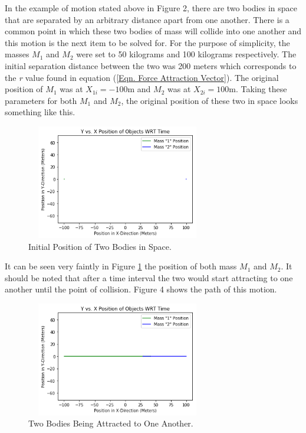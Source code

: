 \documentclass[twocolumn]{article}
\begin{document}
In the example of motion stated above in Figure 2, there are two bodies in space that are separated by an arbitrary distance apart from one another. There is a common point in which these two bodies of mass will collide into one another and this motion is the next item to be solved for. For the purpose of simplicity, the masses $M_1$ and $M_2$ were set to 50 kilograms and 100 kilograms respectively. The initial separation distance between the two was 200 meters which corresponds to the \textit{r} value found in equation (\ref{Eqn. Force Attraction Vector}). The original position of $M_1$ was at $X_{1i}=-100$m and $M_2$ was at $X_{2i}=100$m. Taking these parameters for both $M_1$ and $M_2$, the original position of these two in space looks something like this.
\begin{figure}[ht]
    \centering
    \includegraphics[width=8cm, height=5cm]{Figures/2-Body (1).png}
    \caption{\small{Initial Position of Two Bodies in Space.}}
    \label{Fig. 2-Body Fig. 1}
\end{figure}
\par \noindent
It can be seen very faintly in Figure \ref{Fig. 2-Body Fig. 1} the position of both mass $M_1$ and $M_2$. It should be noted that after a time interval the two would start attracting to one another until the point of collision. Figure 4 shows the path of this motion.
\newpage
\begin{figure}[ht]
    \centering
    \includegraphics[width=8cm, height=5cm]{Figures/2-Body (2).png}
    \caption{\small{Two Bodies Being Attracted to One Another.}}
    \label{Fig. 2-Body Fig. 2}
\end{figure}
\end{document}
